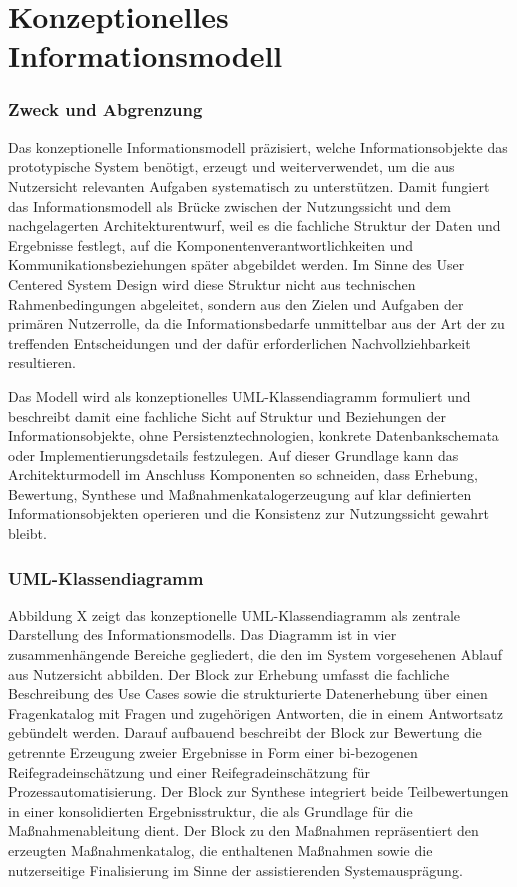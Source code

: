 \section{Konzeptionelles Informationsmodell}\label{sec:konzeptionellesInformationsmodell}

\subsubsection{Zweck und Abgrenzung}
Das konzeptionelle Informationsmodell präzisiert, welche Informationsobjekte das prototypische System benötigt, erzeugt und weiterverwendet, um die aus Nutzersicht relevanten Aufgaben systematisch zu unterstützen. \cite{normanDraper1986,iso9241_210_2019}
Damit fungiert das Informationsmodell als Brücke zwischen der Nutzungssicht und dem nachgelagerten Architekturentwurf, weil es die fachliche Struktur der Daten und Ergebnisse festlegt, auf die Komponentenverantwortlichkeiten und Kommunikationsbeziehungen später abgebildet werden. \cite{iso9241_210_2019,nunamaker1990}
Im Sinne des User Centered System Design wird diese Struktur nicht aus technischen Rahmenbedingungen abgeleitet, sondern aus den Zielen und Aufgaben der primären Nutzerrolle, da die Informationsbedarfe unmittelbar aus der Art der zu treffenden Entscheidungen und der dafür erforderlichen Nachvollziehbarkeit resultieren. \cite{normanDraper1986,iso9241_210_2019}

Das Modell wird als konzeptionelles UML-Klassendiagramm formuliert und beschreibt damit eine fachliche Sicht auf Struktur und Beziehungen der Informationsobjekte, ohne Persistenztechnologien, konkrete Datenbankschemata oder Implementierungsdetails festzulegen. \cite{omgUML251}
Auf dieser Grundlage kann das Architekturmodell im Anschluss Komponenten so schneiden, dass Erhebung, Bewertung, Synthese und Maßnahmenkatalogerzeugung auf klar definierten Informationsobjekten operieren und die Konsistenz zur Nutzungssicht gewahrt bleibt. \cite{nunamaker1990,iso9241_210_2019}


\subsubsection{UML-Klassendiagramm}
Abbildung X zeigt das konzeptionelle UML-Klassendiagramm als zentrale Darstellung des Informationsmodells. Das Diagramm ist in vier zusammenhängende Bereiche gegliedert, die den im System vorgesehenen Ablauf aus Nutzersicht abbilden. Der Block zur Erhebung umfasst die fachliche Beschreibung des Use Cases sowie die strukturierte Datenerhebung über einen Fragenkatalog mit Fragen und zugehörigen Antworten, die in einem Antwortsatz gebündelt werden. Darauf aufbauend beschreibt der Block zur Bewertung die getrennte Erzeugung zweier Ergebnisse in Form einer \gls{bi}-bezogenen Reifegradeinschätzung und einer Reifegradeinschätzung für Prozessautomatisierung. Der Block zur Synthese integriert beide Teilbewertungen in einer konsolidierten Ergebnisstruktur, die als Grundlage für die Maßnahmenableitung dient. Der Block zu den Maßnahmen repräsentiert den erzeugten Maßnahmenkatalog, die enthaltenen Maßnahmen sowie die nutzerseitige Finalisierung im Sinne der assistierenden Systemausprägung.

